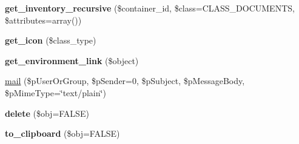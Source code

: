 \begin{DoxyCompactItemize}
\item 
\hypertarget{classlms__steam_aeb03f2dc4b8bee98f63d3de183e195b6}{
{\bfseries get\_\-inventory\_\-recursive} (\$container\_\-id, \$class=CLASS\_\-DOCUMENTS, \$attributes=array())}
\label{classlms__steam_aeb03f2dc4b8bee98f63d3de183e195b6}

\item 
\hypertarget{classlms__steam_ae2002b0627ca847f4508a97414628a29}{
{\bfseries get\_\-icon} (\$class\_\-type)}
\label{classlms__steam_ae2002b0627ca847f4508a97414628a29}

\item 
\hypertarget{classlms__steam_a456b728b5aa783f1e32f54e0392faa95}{
{\bfseries get\_\-environment\_\-link} (\$object)}
\label{classlms__steam_a456b728b5aa783f1e32f54e0392faa95}

\item 
\hyperlink{classlms__steam_a998cea779003b8a82680f6bc710a7b98}{mail} (\$pUserOrGroup, \$pSender=0, \$pSubject, \$pMessageBody, \$pMimeType=\char`\"{}text/plain\char`\"{})
\item 
\hypertarget{classlms__steam_a0079530ef87181517ce2699ec923ea7c}{
{\bfseries delete} (\$obj=FALSE)}
\label{classlms__steam_a0079530ef87181517ce2699ec923ea7c}

\item 
\hypertarget{classlms__steam_a925df255c1dfb3c87dbbfcda4b11179c}{
{\bfseries to\_\-clipboard} (\$obj=FALSE)}
\label{classlms__steam_a925df255c1dfb3c87dbbfcda4b11179c}

\end{DoxyCompactItemize}
